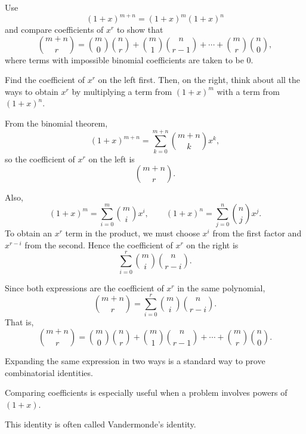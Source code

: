 \begin{problem}
Use
\[
(1+x)^{m+n}=(1+x)^m(1+x)^n
\]
and compare coefficients of $x^r$ to show that
\[
\binom{m+n}{r}=\binom{m}{0}\binom{n}{r}+\binom{m}{1}\binom{n}{r-1}+\cdots+\binom{m}{r}\binom{n}{0},
\]
where terms with impossible binomial coefficients are taken to be $0$.
\end{problem}

\begin{hint}
Find the coefficient of $x^r$ on the left first. Then, on the right, think about all the ways to obtain $x^r$ by multiplying a term from $(1+x)^m$ with a term from $(1+x)^n$.
\end{hint}

\begin{solution}
From the binomial theorem,
\[
(1+x)^{m+n}=\sum_{k=0}^{m+n}\binom{m+n}{k}x^k,
\]
so the coefficient of $x^r$ on the left is
\[
\binom{m+n}{r}.
\]

Also,
\[
(1+x)^m=\sum_{i=0}^m \binom{m}{i}x^i,
\qquad
(1+x)^n=\sum_{j=0}^n \binom{n}{j}x^j.
\]
To obtain an $x^r$ term in the product, we must choose $x^i$ from the first factor and $x^{r-i}$ from the second. Hence the coefficient of $x^r$ on the right is
\[
\sum_{i=0}^r \binom{m}{i}\binom{n}{r-i}.
\]

Since both expressions are the coefficient of $x^r$ in the same polynomial,
\[
\binom{m+n}{r}=\sum_{i=0}^r \binom{m}{i}\binom{n}{r-i}.
\]
That is,
\[
\boxed{
\binom{m+n}{r}
=\binom{m}{0}\binom{n}{r}
+\binom{m}{1}\binom{n}{r-1}
+\cdots
+\binom{m}{r}\binom{n}{0}
}.
\]
\end{solution}

\begin{takeaways}
\item Expanding the same expression in two ways is a standard way to prove combinatorial identities.
\item Comparing coefficients is especially useful when a problem involves powers of $(1+x)$.
\item This identity is often called Vandermonde's identity.
\end{takeaways}

